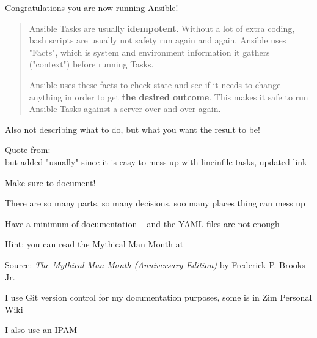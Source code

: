 \documentclass[Screen16to9,17pt]{foils}
\begin{document}
\vskip 5mm
\centerline{Congratulations you are now running Ansible!}



\begin{quote}
Ansible Tasks are usually {\bf idempotent}. Without a lot of extra coding, bash scripts are usually not safety run again and again. Ansible uses "Facts", which is system and environment information it gathers ("context") before running Tasks.

Ansible uses these facts to check state and see if it needs to change anything in order to get {\bf the desired outcome}. This makes it safe to run Ansible Tasks against a server over and over again.
\end{quote}

Also not describing what to do, but what you want the result to be!

Quote from:\\
 but added "usually" since it is easy to mess up with lineinfile tasks, updated link 



\begin{list2}
\item Make sure to document!
\item There are so many parts, so many decisions, soo many places thing can mess up
\item Have a minimum of documentation -- and the YAML files are not enough
\item Hint:  you can read the Mythical Man Month at 
\end{list2}


Source: \emph{The Mythical Man-Month (Anniversary Edition)}
by Frederick P. Brooks Jr.

\begin{list2}
\item I use Git version control for my documentation purposes, some is in Zim Personal Wiki 
\item I also use an IPAM 
\end{list2}
\end{document}
